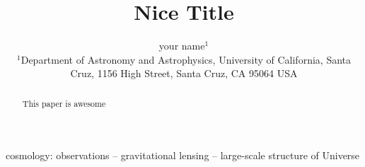 \documentclass[useAMS,usenatbib,twocolumn]{mnras}
\begin{document}
  


\title[nice title]{Nice Title}






 \author[someone et al.]  {your name$^{1}$\newauthor
\\
$^1$Department of Astronomy and Astrophysics, University of California, Santa Cruz, 1156 High Street, Santa Cruz, CA 95064 USA}


\maketitle
\label{firstpage}

 
\begin{abstract} This paper is awesome \end{abstract}

 
\begin{keywords}
cosmology: observations -- gravitational lensing -- large-scale structure of Universe
\end{keywords}
 

 
 
\end{document}
